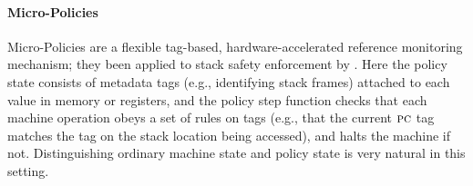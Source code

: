 \documentclass[acmsmall,review,anonymous]{acmart}\settopmatter{printfolios=true,printccs=false,printacmref=false}
\begin{document}
\paragraph*{Micro-Policies}
%
Micro-Policies are a flexible tag-based, hardware-accelerated
reference monitoring mechanism; they been applied to stack safety
enforcement by \citet{DBLP:conf/sp/RoesslerD18}.
Here the policy state consists of metadata tags (e.g., identifying stack frames)
attached to each value in memory or registers, and the policy step
function checks that each machine operation obeys a set of rules on tags
(e.g., that the current $\textsc{pc}$ tag matches the tag on the stack
location being accessed), and halts the machine if not.  Distinguishing
ordinary machine state and policy state is very natural in this setting.


\ifaftersubmission{}\fi


\end{document}
